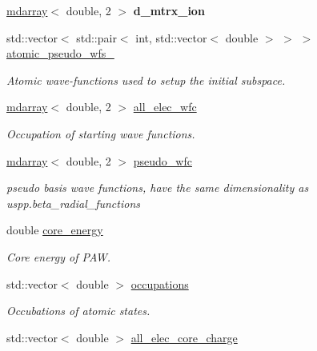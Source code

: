\begin{DoxyCompactItemize}
\item 
\hypertarget{structpseudopotential__descriptor_aad669129d92f069f28c034bcac27410a}{}\hyperlink{classsddk_1_1mdarray}{mdarray}$<$ double, 2 $>$ {\bfseries d\+\_\+mtrx\+\_\+ion}\label{structpseudopotential__descriptor_aad669129d92f069f28c034bcac27410a}

\item 
std\+::vector$<$ std\+::pair$<$ int, std\+::vector$<$ double $>$ $>$ $>$ \hyperlink{structpseudopotential__descriptor_a6b1810865747a5458d1b0f4aab49193e}{atomic\+\_\+pseudo\+\_\+wfs\+\_\+}
\begin{DoxyCompactList}\small\item\em Atomic wave-\/functions used to setup the initial subspace. \end{DoxyCompactList}\item 
\hyperlink{classsddk_1_1mdarray}{mdarray}$<$ double, 2 $>$ \hyperlink{structpseudopotential__descriptor_abd17ce96ffb443283187144e61750776}{all\+\_\+elec\+\_\+wfc}
\begin{DoxyCompactList}\small\item\em Occupation of starting wave functions. \end{DoxyCompactList}\item 
\hyperlink{classsddk_1_1mdarray}{mdarray}$<$ double, 2 $>$ \hyperlink{structpseudopotential__descriptor_a6a1450bee7e75c41ce208b83942e490e}{pseudo\+\_\+wfc}
\begin{DoxyCompactList}\small\item\em pseudo basis wave functions, have the same dimensionality as uspp.\+beta\+\_\+radial\+\_\+functions \end{DoxyCompactList}\item 
double \hyperlink{structpseudopotential__descriptor_a455e05af3c31216aa1a27e57b9bdca35}{core\+\_\+energy}
\begin{DoxyCompactList}\small\item\em Core energy of P\+A\+W. \end{DoxyCompactList}\item 
std\+::vector$<$ double $>$ \hyperlink{structpseudopotential__descriptor_aaed84abbeec2fd1b036b4eeadf05559c}{occupations}
\begin{DoxyCompactList}\small\item\em Occubations of atomic states. \end{DoxyCompactList}\item 
std\+::vector$<$ double $>$ \hyperlink{structpseudopotential__descriptor_a885a4c05a931acf8346f074f64914698}{all\+\_\+elec\+\_\+core\+\_\+charge}

\end{DoxyCompactItemize}
